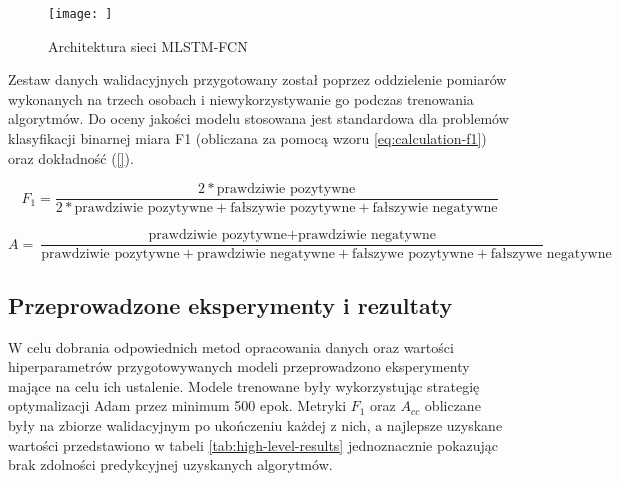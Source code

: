 \documentclass{./assets/wfis}
\begin{document}
\begin{figure}[h!]
    \centering
    \texttt{[image: ]}
    \caption{Architektura sieci MLSTM-FCN}
    \label{fig:mlstm}
\end{figure}


Zestaw danych walidacyjnych przygotowany został poprzez oddzielenie pomiarów wykonanych na trzech osobach i niewykorzystywanie go podczas trenowania algorytmów. Do oceny jakości modelu stosowana jest standardowa dla problemów klasyfikacji binarnej miara F1 (obliczana za pomocą wzoru \ref{eq:calculation-f1}) oraz dokładność (\autoref{}).

\begin{equation}\label{eq:calculation-f1}
    F_1 = \frac{2*\text{prawdziwie pozytywne}}{2*\text{prawdziwie pozytywne}+\text{fałszywie pozytywne}+\text{fałszywie negatywne}}
\end{equation}

\begin{equation}
    A = \frac{\text{prawdziwie pozytywne} + \text{prawdziwie negatywne}}{\text{prawdziwie pozytywne} + \text{prawdziwie negatywne} + \text{fałszywe pozytywne} + \text{fałszywe negatywne}}
\end{equation}


\subsection{Przeprowadzone eksperymenty i rezultaty}
W celu dobrania odpowiednich metod opracowania danych oraz wartości hiperparametrów przygotowywanych modeli przeprowadzono eksperymenty mające na celu ich ustalenie. Modele trenowane były wykorzystując strategię optymalizacji Adam \cite{kingma_adam_2017} przez minimum 500 epok. Metryki $F_1$ oraz $A_{cc}$ obliczane były na zbiorze walidacyjnym po ukończeniu każdej z nich, a najlepsze uzyskane wartości przedstawiono w tabeli \ref{tab:high-level-results} jednoznacznie pokazując brak zdolności predykcyjnej uzyskanych algorytmów.



\end{document}
